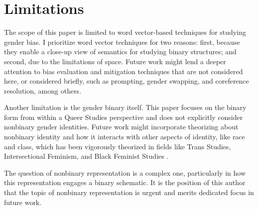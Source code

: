 \documentclass[11pt]{article}
\begin{document}
\section*{Limitations}

The scope of this paper is limited to word
vector-based techniques for studying gender bias. I prioritize word vector techniques for two reasons:
first, because they enable a close-up view of semantics for studying binary structures;
and second, due to the limitations of space. Future work might lend a
deeper attention to bias evaluation and mitigation techniques that are
not considered here, or considered briefly, such as prompting, gender
swapping, and coreference resolution, among others.

Another limitation is the gender binary itself. This paper focuses on
the binary form from within a Queer Studies perspective and does not explicitly consider nonbinary gender
identities. Future work might incorporate theorizing about nonbinary identity and how it
interacts with other aspects of identity, like race and class, which has been vigorously theorized in fields like Trans Studies, Intersectional
Feminism, and Black Feminist Studies \citep{amin:2022,hooks:2000,munoz:2009,klein:2024}.

The
question of nonbinary representation is a complex one, particularly in
how this representation engages a binary schematic. It is the position
of this author that the topic of nonbinary representation is urgent
and merits dedicated focus in future work.


\end{document}
